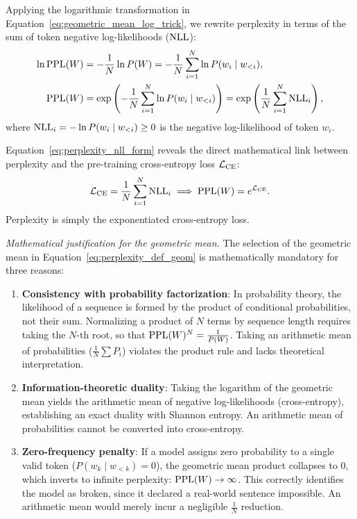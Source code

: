 \documentclass[../../main.tex]{subfiles}
\begin{document}
Applying the logarithmic transformation in Equation~\eqref{eq:geometric_mean_log_trick}, we rewrite perplexity in terms of the sum of token negative log-likelihoods ($\mathrm{NLL}$):
\begin{align}
\ln \mathrm{PPL}(W) &= -\frac{1}{N} \ln P(W) = -\frac{1}{N} \sum_{i=1}^N \ln P(w_i \mid w_{<i}), \\
\label{eq:perplexity_nll_form}
\mathrm{PPL}(W) &= \exp\left( -\frac{1}{N} \sum_{i=1}^N \ln P(w_i \mid w_{<i}) \right) = \exp\left( \frac{1}{N} \sum_{i=1}^N \mathrm{NLL}_i \right),
\end{align}
where $\mathrm{NLL}_i = -\ln P(w_i \mid w_{<i}) \ge 0$ is the negative log-likelihood of token $w_i$.

Equation~\eqref{eq:perplexity_nll_form} reveals the direct mathematical link between perplexity and the pre-training cross-entropy loss $\mathcal{L}_{\text{CE}}$:
\begin{equation}
\label{eq:perplexity_cross_entropy_equiv}
\mathcal{L}_{\text{CE}} = \frac{1}{N} \sum_{i=1}^N \mathrm{NLL}_i \implies \mathrm{PPL}(W) = e^{\mathcal{L}_{\text{CE}}}.
\end{equation}
Perplexity is simply the exponentiated cross-entropy loss.

\textit{Mathematical justification for the geometric mean.} The selection of the geometric mean in Equation~\eqref{eq:perplexity_def_geom} is mathematically mandatory for three reasons:
\begin{enumerate}
    \item \textbf{Consistency with probability factorization}: In probability theory, the likelihood of a sequence is formed by the product of conditional probabilities, not their sum. Normalizing a product of $N$ terms by sequence length requires taking the $N$-th root, so that $\mathrm{PPL}(W)^N = \frac{1}{P(W)}$. Taking an arithmetic mean of probabilities ($\frac{1}{N}\sum P_i$) violates the product rule and lacks theoretical interpretation.
    \item \textbf{Information-theoretic duality}: Taking the logarithm of the geometric mean yields the arithmetic mean of negative log-likelihoods (cross-entropy), establishing an exact duality with Shannon entropy. An arithmetic mean of probabilities cannot be converted into cross-entropy.
    \item \textbf{Zero-frequency penalty}: If a model assigns zero probability to a single valid token ($P(w_k \mid w_{<k}) = 0$), the geometric mean product collapses to 0, which inverts to infinite perplexity: $\mathrm{PPL}(W) \to \infty$. This correctly identifies the model as broken, since it declared a real-world sentence impossible. An arithmetic mean would merely incur a negligible $\frac{1}{N}$ reduction.
\end{enumerate}
\end{document}
